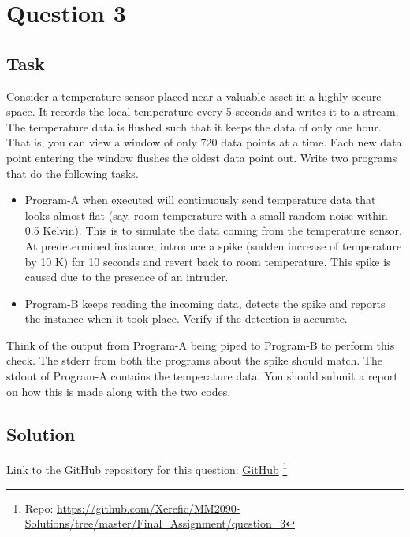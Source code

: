\section{Question 3}

\subsection{Task}
Consider a temperature sensor placed near a valuable asset in a highly secure space. It records the local temperature every 5 seconds and writes it to a stream. The temperature data is flushed such that it keeps the data of only one hour. That is, you can view a window of only 720 data points at a time. Each new data point entering the window flushes the oldest data point out. Write two programs that do the following tasks.
\begin{itemize}
	\item Program-A when executed will continuously send temperature data that looks almost flat (say, room temperature with a small random noise within 0.5 Kelvin). This is to simulate the data coming from the temperature sensor. At predetermined instance, introduce a spike (sudden increase of temperature by 10 K) for 10 seconds and revert back to room temperature. This spike is caused due to the presence of an intruder.
	\item Program-B keeps reading the incoming data, detects the spike and reports the instance when it took place. Verify if the detection is accurate.
\end{itemize}
Think of the output from Program-A being piped to Program-B to perform this check. The stderr from both the programs about the spike should match. The stdout of Program-A contains the temperature data. You should submit a report on how this is made along with the two codes.

\subsection{Solution}

Link to the GitHub repository for this question: \href{https://github.com/Xerefic/MM2090-Solutions/tree/master/Final_Assignment/question_3}{GitHub} \footnote{Repo: \url{https://github.com/Xerefic/MM2090-Solutions/tree/master/Final_Assignment/question_3}}